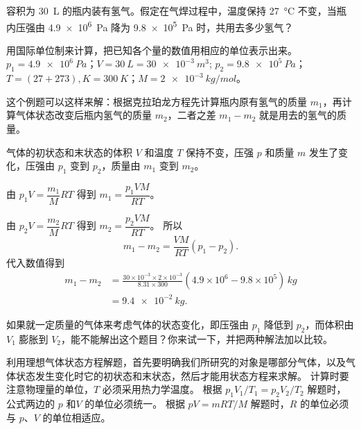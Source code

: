 \begin{example}
容积为 \qty{30}{L} 的瓶内装有氢气。假定在气焊过程中，温度保持 \qty{27}{\celsius} 不变，当瓶内压强由 \qty{4.9e6}{Pa} 降为 \qty{9.8e5}{Pa} 时，共用去多少氢气？
\end{example}

\begin{solution}
用国际单位制来计算，把已知各个量的数值用相应的单位表示出来。
$p_1=\qty{4.9e6}{Pa}$；$V=\qty{30}{L}=\qty{30e-3}{m^3}$; $p_2=\qty{9.8e5}{Pa}$；$T=(27+273),\unit{K}=\qty{300}{K}$；$M=\qty{2e-3}{kg/mol}$。

这个例题可以这样来解：根据克拉珀龙方程先计算瓶内原有氢气的质量 $m_1$，再计算气体状态改变后瓶内氢气的质量 $m_2$，二者之差 $m_1-m_2$ 就是用去的氢气的质量。

气体的初状态和末状态的体积 $V$ 和温度 $T$ 保持不变，压强 $p$ 和质量 $m$ 发生了变化，压强由 $p_1$ 变到 $p_2$，质量由 $m_1$ 变到 $m_2$。

由 $p_1V=\dfrac{m_1}{M}RT$ 得到 $m_1=\dfrac{p_1VM}{RT}$。

由 $p_2V=\dfrac{m_2}{M}RT$ 得到 $m_2=\dfrac{p_2VM}{RT}$。
所以
\[m_1-m_2=\frac{VM}{RT}(p_1-p_2).\]
代入数值得到
\[\begin{split}
m_1-m_2&=\frac{30\times 10^{-3}\times 2\times 10^{-3}}{8.31\times 300}(4.9\times 10^6-9.8\times 10^5)\,\unit{kg}\\
	&=\qty{9.4e-2}{kg}.
\end{split} \]
\end{solution}

如果就一定质量的气体来考虑气体的状态变化，即压强由 $p_1$ 降低到 $p_2$，而体积由$V_1$ 膨胀到 $V_2$，能不能解出这个题目？你来试一下，并把两种解法加以比较。

利用理想气体状态方程解题，首先要明确我们所研究的对象是哪部分气体，以及气体状态发生变化时它的初状态和末状态，然后才能用状态方程来求解。
计算时要注意物理量的单位，$T$ 必须采用热力学温度。
根据 $p_1V_1/T_1=p_2V_2/T_2$ 解题时，公式两边的 $p$ 和$V$ 的单位必须统一。
根据 $pV=mRT/M$ 解题时，$R$ 的单位必须与 $p$、$V$ 的单位相适应。


